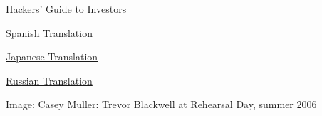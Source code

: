               
                \href{http://www.paulgraham.com/guidetoinvestors.html}{Hackers' Guide to Investors}


              
            
            
              
            
            
              
            
            
              
                
              
              
              
                \href{http://www.simpleoption.com/ensayo-como-presentarte-inversores.html}{Spanish Translation}


              
              
              
                
              
              
              
                \href{http://d.hatena.ne.jp/lionfan/20070130}{Japanese Translation}


              
            
            
              
            
            
              
            
            
              
                
              
              
              
                \href{http://www.perevedem.ru/article/investors.htm}{Russian Translation}


              
            
            
              
            
          

            
              
                


                  
                  
                    Image: Casey Muller: Trevor Blackwell at Rehearsal Day,
                    summer 2006
              
            
          
